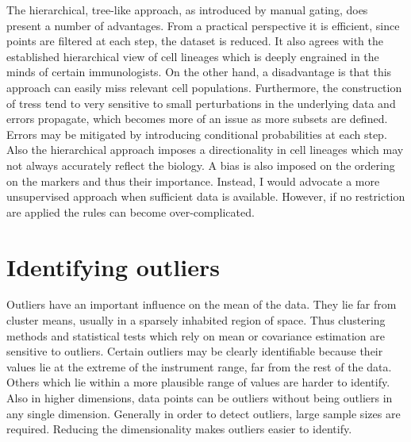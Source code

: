 The hierarchical, tree-like approach, as introduced by manual gating, does present a number of advantages.
From a practical perspective it is efficient, since points are filtered at each step, the dataset is reduced.
It also agrees with the established hierarchical view of cell lineages which is deeply engrained in the minds of certain immunologists.
On the other hand, a disadvantage is that this approach can easily miss relevant cell populations.
Furthermore, the construction of tress tend to very sensitive to small perturbations in the underlying data and errors propagate, which becomes more of an issue as more subsets are defined. 
Errors may be mitigated by introducing conditional probabilities at each step.
Also the hierarchical approach imposes a directionality in cell lineages which may not always accurately reflect the biology.
A bias is also imposed on the ordering on the markers and thus their importance. 
Instead, I would advocate a more unsupervised approach when sufficient data is available.
However, if no restriction are applied the rules can become over-complicated.


\section{ Identifying outliers }

Outliers have an important influence on the mean of the data.
They lie far from cluster means, usually in a sparsely inhabited region of space.
Thus clustering methods and statistical tests which rely on mean or covariance estimation are sensitive to outliers.
Certain outliers may be clearly identifiable because their values lie at the extreme of the instrument range,
far from the rest of the data.
Others which lie within a more plausible range of values are harder to identify.
Also in higher dimensions, data points can be outliers without being outliers in any single dimension.
Generally in order to detect outliers, large sample sizes are required.
Reducing the dimensionality makes outliers easier to identify.

